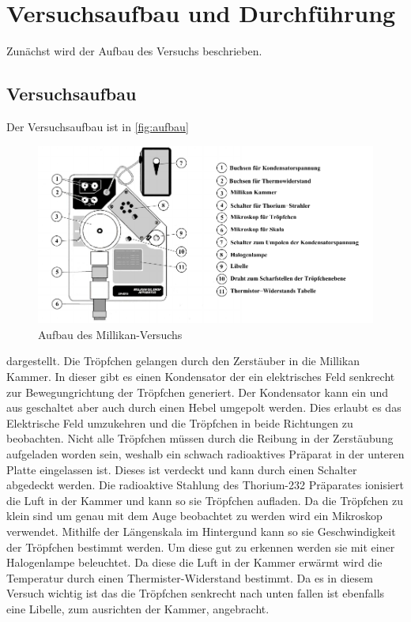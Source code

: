 \section{Versuchsaufbau und Durchführung}
\label{sec:Durchführung}
Zunächst wird der Aufbau des Versuchs beschrieben.
\subsection{Versuchsaufbau}
\label{ssec:Versuchsaufbau}
Der Versuchsaufbau ist in \autoref{fig:aufbau}
\begin{figure}[H]
    \centering
    \includegraphics{content/graphics/Aufbau.pdf}
    \caption{Aufbau des Millikan-Versuchs \cite{v503}}
    \label{fig:aufbau}
\end{figure}
dargestellt. Die Tröpfchen gelangen durch den Zerstäuber in die Millikan Kammer.
In dieser gibt es einen Kondensator der ein elektrisches Feld senkrecht zur Bewegungrichtung der Tröpfchen generiert.
Der Kondensator kann ein und aus geschaltet aber auch durch einen Hebel umgepolt werden.
Dies erlaubt es das Elektrische Feld umzukehren und die Tröpfchen in beide Richtungen zu beobachten.
Nicht alle Tröpfchen müssen durch die Reibung in der Zerstäubung aufgeladen worden sein, weshalb ein schwach radioaktives Präparat
in der unteren Platte eingelassen ist. Dieses ist verdeckt und kann durch einen Schalter abgedeckt werden.
Die radioaktive Stahlung des Thorium-232 Präparates ionisiert die Luft in der Kammer und kann so sie
Tröpfchen aufladen. Da die Tröpfchen zu klein sind um genau mit dem Auge beobachtet zu werden wird ein Mikroskop verwendet.
Mithilfe der Längenskala im Hintergund kann so sie Geschwindigkeit der Tröpfchen bestimmt werden.
Um diese gut zu erkennen werden sie mit einer Halogenlampe beleuchtet. Da diese die Luft in der Kammer erwärmt wird die Temperatur durch einen Thermister-Widerstand bestimmt.
Da es in diesem Versuch wichtig ist das die Tröpfchen senkrecht nach unten fallen ist ebenfalls eine Libelle, zum ausrichten der Kammer, angebracht.
